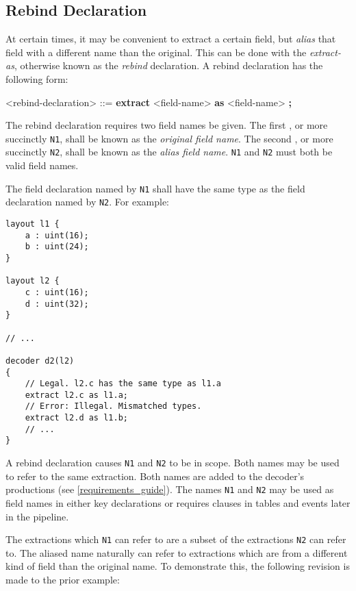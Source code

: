 \subsection{Rebind Declaration} \label{rebind_guide}

At certain times, it may be convenient to extract a certain field, but \textit{alias} that field with a different name than the original. This can be done with the \textit{extract-as}, otherwise known as the \textit{rebind} declaration. A rebind declaration has the following form:

\begin{minip}
\begin{grammar}
<rebind-declaration> ::=
\textbf{extract} <field-name> \textbf{as} <field-name> \textbf{;}
\end{grammar}
\end{minip}

The rebind declaration requires two field names be given. The first , or more succinctly \texttt{N1}, shall be known as the \textit{original field name}. The second , or more succinctly \texttt{N2}, shall be known as the \textit{alias field name}. \texttt{N1} and \texttt{N2} must both be valid field names.

The field declaration named by \texttt{N1} shall have the same type as the field declaration named by \texttt{N2}. For example:

\begin{minip}
\begin{lstlisting}
layout l1 {
	a : uint(16);
	b : uint(24);
}

layout l2 {
	c : uint(16);
	d : uint(32);
}

// ...

decoder d2(l2)
{
	// Legal. l2.c has the same type as l1.a
	extract l2.c as l1.a;
	// Error: Illegal. Mismatched types.
	extract l2.d as l1.b;
	// ...
} 
\end{lstlisting}
\end{minip}

A rebind declaration causes \texttt{N1} and \texttt{N2} to be in scope. Both names may be used to refer to the same extraction. Both names are added to the decoder's productions (see \ref{requirements_guide}). The names \texttt{N1} and \texttt{N2} may be used as field names in either key declarations or requires clauses in tables and events later in the pipeline. 

The extractions which \texttt{N1} can refer to are a subset of the extractions \texttt{N2} can refer to. The aliased name naturally can refer to extractions which are from a different kind of field than the original name. To demonstrate this, the following revision is made to the prior example:

